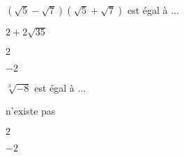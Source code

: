 \begin{QCM}
\begin{GroupeQCM}
\begin{exercice}$(\sqrt{5}-\sqrt{7})(\sqrt{5}+\sqrt{7})$ est égal à ...
\begin{ChoixQCM}{3}
\item $2+2\sqrt{35}$
\item $2$
\item $-2$
\end{ChoixQCM}
\begin{corrige}
\end{corrige}
\end{exercice}

\begin{exercice}$\sqrt[3]{-8}$ est égal à ...
\begin{ChoixQCM}{3}
\item n'existe pas
\item $2$
\item $-2$
\end{ChoixQCM}
\begin{corrige}
\end{corrige}
\end{exercice}

\end{GroupeQCM}
\end{QCM}

  
